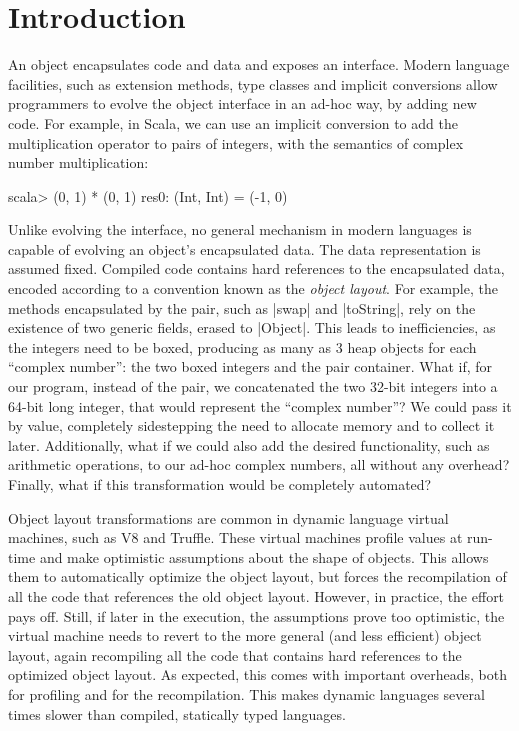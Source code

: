 \section{Introduction}
\label{sec:intro}

An object encapsulates code and data and exposes an interface. Modern
language facilities, such as extension methods, type classes and
implicit conversions allow programmers to evolve the object interface
in an ad-hoc way, by adding new code. For example, in Scala, we can
use an implicit conversion to add the multiplication operator to pairs
of integers, with the semantics of complex number multiplication:

\begin{lstlisting-nobreak}
scala> (0, 1) * (0, 1)
res0: (Int, Int) = (-1, 0)
\end{lstlisting-nobreak}

Unlike evolving the interface, no general mechanism in modern
languages is capable of evolving an object's encapsulated data. The
data representation is assumed fixed. Compiled code contains hard
references to the encapsulated data, encoded according to a convention
known as the \emph{object layout}. For example, the methods
encapsulated by the pair, such as |swap| and |toString|, rely on the
existence of two generic fields, erased to |Object|. This leads to
inefficiencies, as the integers need to be boxed, producing as many as
3 heap objects for each ``complex number'': the two boxed integers and
the pair container. What if, for our program, instead of the pair, we
concatenated the two 32-bit integers into a 64-bit long integer, that
would represent the ``complex number''? We could pass it by value,
completely sidestepping the need to allocate memory and to collect it
later. Additionally, what if we could also add the desired
functionality, such as arithmetic operations, to our ad-hoc complex
numbers, all without any overhead?  Finally, what if this
transformation would be completely automated?

Object layout transformations are common in dynamic language virtual machines, such as V8 and Truffle. These virtual machines profile values at run-time and make optimistic assumptions about the shape of objects. This allows them to automatically optimize the object layout, but forces the recompilation of all the code that references the old object layout. However, in practice, the effort pays off. Still, if later in the execution, the assumptions prove too optimistic, the virtual machine needs to revert to the more general (and less efficient) object layout, again recompiling all the code that contains hard references to the optimized object layout. As expected, this comes with important overheads, both for profiling and for the recompilation. This makes dynamic languages several times slower than compiled, statically typed languages.

